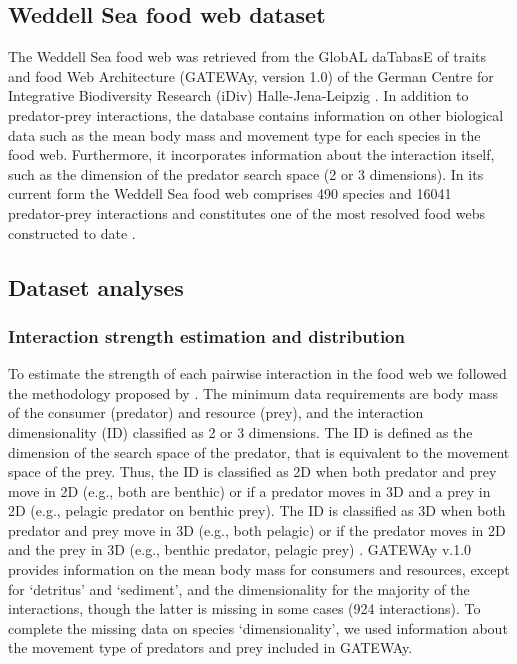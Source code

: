 \documentclass[gc, manuscript]{copernicus}
\begin{document}
\subsection{Weddell Sea food web dataset}

The Weddell Sea food web was retrieved from the GlobAL daTabasE of
traits and food Web Architecture (GATEWAy, version 1.0) of the German
Centre for Integrative Biodiversity Research (iDiv) Halle-Jena-Leipzig
\citep{Brose2018}. In addition to predator-prey interactions, the
database contains information on other biological data such as the mean
body mass and movement type for each species in the food web.
Furthermore, it incorporates information about the interaction itself,
such as the dimension of the predator search space (2 or 3 dimensions).
In its current form the Weddell Sea food web comprises 490 species and
16041 predator-prey interactions and constitutes one of the most
resolved food webs constructed to date \citep{Jacob2011}.

\subsection{Dataset analyses}

\subsubsection{Interaction strength estimation and distribution}

To estimate the strength of each pairwise interaction in the food web we
followed the methodology proposed by \citet{Pawar2012}. The minimum data
requirements are body mass of the consumer (predator) and resource
(prey), and the interaction dimensionality (ID) classified as 2 or 3
dimensions. The ID is defined as the dimension of the search space of
the predator, that is equivalent to the movement space of the prey.
Thus, the ID is classified as 2D when both predator and prey move in 2D
(e.g., both are benthic) or if a predator moves in 3D and a prey in 2D
(e.g., pelagic predator on benthic prey). The ID is classified as 3D
when both predator and prey move in 3D (e.g., both pelagic) or if the
predator moves in 2D and the prey in 3D (e.g., benthic predator, pelagic
prey) \citep{Pawar2012}. GATEWAy v.1.0 provides information on the mean
body mass for consumers and resources, except for `detritus' and
`sediment', and the dimensionality for the majority of the interactions,
though the latter is missing in some cases (924 interactions). To
complete the missing data on species `dimensionality', we used
information about the movement type of predators and prey included in
GATEWAy.
\end{document}
